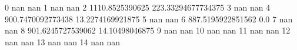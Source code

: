 0 nan nan
1 nan nan
2 1110.8525390625 223.33294677734375
3 nan nan
4 900.7470092773438 13.2274169921875
5 nan nan
6 887.5195922851562 0.0
7 nan nan
8 901.6245727539062 14.10498046875
9 nan nan
10 nan nan
11 nan nan
12 nan nan
13 nan nan
14 nan nan
